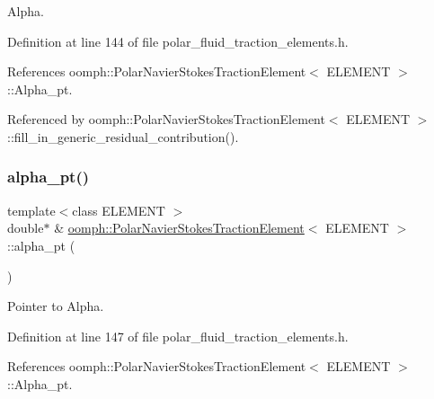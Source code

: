 Alpha. 



Definition at line 144 of file polar\+\_\+fluid\+\_\+traction\+\_\+elements.\+h.



References oomph\+::\+Polar\+Navier\+Stokes\+Traction\+Element$<$ E\+L\+E\+M\+E\+N\+T $>$\+::\+Alpha\+\_\+pt.



Referenced by oomph\+::\+Polar\+Navier\+Stokes\+Traction\+Element$<$ E\+L\+E\+M\+E\+N\+T $>$\+::fill\+\_\+in\+\_\+generic\+\_\+residual\+\_\+contribution().

\mbox{\label{classoomph_1_1PolarNavierStokesTractionElement_ab9bd68ca6e8e237a3e95862baaac2450}} 
\subsubsection{\texorpdfstring{alpha\+\_\+pt()}{alpha\_pt()}}
{\footnotesize\ttfamily template$<$class E\+L\+E\+M\+E\+NT $>$ \\
double$\ast$ \& \hyperlink{classoomph_1_1PolarNavierStokesTractionElement}{oomph\+::\+Polar\+Navier\+Stokes\+Traction\+Element}$<$ E\+L\+E\+M\+E\+NT $>$\+::alpha\+\_\+pt (\begin{DoxyParamCaption}{ }\end{DoxyParamCaption})\hspace{0.3cm}{\ttfamily [inline]}}



Pointer to Alpha. 



Definition at line 147 of file polar\+\_\+fluid\+\_\+traction\+\_\+elements.\+h.



References oomph\+::\+Polar\+Navier\+Stokes\+Traction\+Element$<$ E\+L\+E\+M\+E\+N\+T $>$\+::\+Alpha\+\_\+pt.

\mbox{\label{classoomph_1_1PolarNavierStokesTractionElement_a07805e640ad3179ad30d53e2210fa98e}} 
